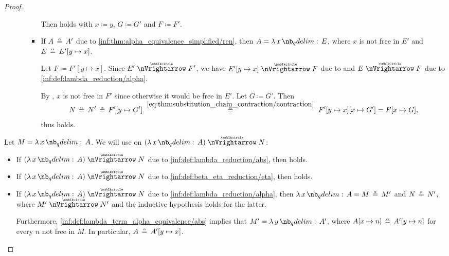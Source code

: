 \begin{proof}
\begin{itemize}
\begin{itemize}
\begin{itemize}
        Then  holds with \( x \coloneqq y \), \( G \coloneqq G' \) and \( F \coloneqq F' \).

        \item If \( A \aequiv A' \) due to \ref{inf:thm:alpha_equivalence_simplified/ren}, then \( A = \qabs x E \), where \( x \) is not free in \( E' \) and \( E \aequiv E'[y \mapsto x] \).

        Let \( F \coloneqq F'[y \mapsto x] \). Since \( E' \ppred F' \), we have \( E'[y \mapsto x] \ppred F \) due to  and \( E \ppred F \) due to \ref{inf:def:lambda_reduction/alpha}.

        By , \( x \) is not free in \( F' \) since otherwise it would be free in \( E' \). Let \( G \coloneqq G' \). Then
        \begin{equation*}
          N
          \aequiv
          N'
          \aequiv
          F'[y \mapsto G']
          \reloset {\eqref{eq:thm:substitution_chain_contraction/contraction}} \aequiv
          F'[y \mapsto x][x \mapsto G']
          =
          F[x \mapsto G],
        \end{equation*}
        thus  holds.
      \end{itemize}
    \end{itemize}
  \end{itemize}

   Let \( M = \qabs x A \). We will use  on \( (\qabs x A) \ppred N \):
  \begin{itemize}
    \item If \( (\qabs x A) \ppred N \) due to \ref{inf:def:lambda_reduction/abs}, then  holds.

    \item If \( (\qabs x A) \ppred N \) due to \ref{inf:def:beta_eta_reduction/eta}, then  holds.

    \item If \( (\qabs x A) \ppred N \) due to \ref{inf:def:lambda_reduction/alpha}, then \( \qabs x A = M \aequiv M' \) and \( N \aequiv N' \), where \( M' \ppred N' \) and the inductive hypothesis holds for the latter.

    Furthermore, \ref{inf:def:lambda_term_alpha_equivalence/abs} implies that \( M' = \qabs y A' \), where \( A[x \mapsto n] \aequiv A'[y \mapsto n] \) for every \( n \) not free in \( M \). In particular, \( A \aequiv A'[y \mapsto x] \).


\end{itemize}
\end{proof}
